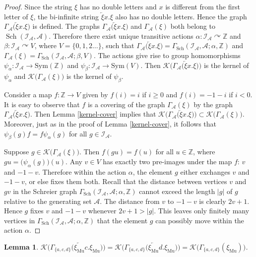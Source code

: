 \documentclass[12pt]{article}
\newtheorem{lemma}[theorem]{Lemma}
\theoremstyle{definition}
\def\bZ{\mathbb{Z}}
\def\cA{\mathcal{A}}
\def\cI{\mathcal{I}}
\def\cK{\mathcal{K}}
\def\al{\alpha}
\def\xiGE{\xi_{\mathrm{Mu}}}
\def\Sch{\mathop{\mathrm{Sch}}}
\begin{document}
\begin{proof}
Since the string $\xi$ has no double letters and $x$ is different from the 
first letter of $\xi$, the bi-infinite string $\overleftarrow{\xi}\!x.\xi$ 
also has no double letters.  Hence the graph 
$\Gamma_{\cA}\bigl(\overleftarrow{\xi}\!x.\xi\bigr)$ is defined.  The 
graphs $\Gamma_{\cA}\bigl(\overleftarrow{\xi}\!x.\xi\bigr)$ and 
$\Gamma_{\cA}(\xi)$ both belong to $\Sch(\cI_{\cA},\cA)$.  Therefore there 
exist unique transitive actions $\al:\cI_{\cA}\curvearrowright\bZ$ and 
$\beta:\cI_{\cA}\curvearrowright V$, where $V=\{0,1,2\dots\}$, such that 
$\Gamma_{\cA}\bigl(\overleftarrow{\xi}\!x.\xi\bigr)= 
\Gamma_{\Sch}(\cI_{\cA},\cA;\al,\bZ)$ and 
$\Gamma_{\cA}(\xi)=\Gamma_{\Sch}(\cI_{\cA},\cA;\beta,V)$.  The actions give 
rise to group homomorphisms $\psi_\al:\cI_{\cA}\to\mathrm{Sym}(\bZ)$ and 
$\psi_\beta:\cI_{\cA}\to\mathrm{Sym}(V)$.  Then 
$\cK\bigl(\Gamma_{\cA}\bigl(\overleftarrow{\xi}\!x.\xi\bigr)\bigr)$ is the 
kernel of $\psi_\al$ and $\cK\bigl(\Gamma_{\cA}(\xi)\bigr)$ is the kernel 
of $\psi_\beta$.

Consider a map $f:\bZ\to V$ given by $f(i)=i$ if $i\ge0$ and $f(i)=-1-i$ if 
$i<0$.  It is easy to observe that $f$ is a covering of the graph 
$\Gamma_{\cA}(\xi)$ by the graph 
$\Gamma_{\cA}\bigl(\overleftarrow{\xi}\!x.\xi\bigr)$.  Then Lemma 
\ref{kernel-cover} implies that 
$\cK\bigl(\Gamma_{\cA}\bigl(\overleftarrow{\xi}\!x.\xi\bigr)\bigr) 
\subset\cK\bigl(\Gamma_{\cA}(\xi)\bigr)$.  Moreover, just as in the proof 
of Lemma \ref{kernel-cover}, it follows that $\psi_\beta(g)f=f\psi_\al(g)$ 
for all $g\in\cI_{\cA}$.

Suppose $g\in\cK\bigl(\Gamma_{\cA}(\xi)\bigr)$.  Then $f(gu)=f(u)$ for all 
$u\in\bZ$, where $gu=\bigl(\psi_\al(g)\bigr)(u)$.  Any $v\in V$ has exactly 
two pre-images under the map $f$: $v$ and $-1-v$.  Therefore within the 
action $\al$, the element $g$ either exchanges $v$ and $-1-v$, or else 
fixes them both.  Recall that the distance between vertices $v$ and $gv$ in 
the Schreier graph $\Gamma_{\Sch}(\cI_{\cA},\cA;\al,\bZ)$ cannot exceed the 
length $|g|$ of $g$ relative to the generating set $\cA$.  The distance 
from $v$ to $-1-v$ is clearly $2v+1$.  Hence $g$ fixes $v$ and $-1-v$ 
whenever $2v+1>|g|$.  This leaves only finitely many vertices in 
$\Gamma_{\Sch}(\cI_{\cA},\cA;\al,\bZ)$ that the element $g$ can possibly 
move within the action $\al$.
\end{proof}

\begin{lemma}\label{GE-line-halfline}
$\cK\bigl(\Gamma_{\{a,c,d\}}\bigl(\overleftarrow{\xiGE}c.\xiGE\bigr)\bigr)
=\cK\bigl(\Gamma_{\{a,c,d\}}\bigl(\overleftarrow{\xiGE}d.\xiGE\bigr)\bigr)
=\cK\bigl(\Gamma_{\{a,c,d\}}(\xiGE)\bigr)$.
\end{lemma}
\end{document}
